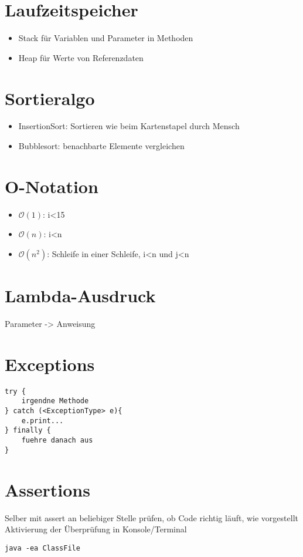 \documentclass[10pt,a4paper]{article}
\begin{document}
\section{Laufzeitspeicher}
\begin{itemize}
\item Stack für Variablen und Parameter in Methoden
\item Heap für Werte von Referenzdaten
\end{itemize}

\section{Sortieralgo}
\begin{itemize}
\item InsertionSort: Sortieren wie beim Kartenstapel durch Mensch
\item Bubblesort: benachbarte Elemente vergleichen
\end{itemize}

\section{O-Notation}
\begin{itemize}
\item $\mathcal{O}(1)$: i<15
\item $\mathcal{O}(n)$: i<n
\item $\mathcal{O}(n^2)$: Schleife in einer Schleife, i<n und j<n
\end{itemize}

\section{Lambda-Ausdruck}
Parameter -> Anweisung

\section{Exceptions}
\begin{lstlisting}
try {
	irgendne Methode
} catch (<ExceptionType> e){
	e.print...
} finally {
	fuehre danach aus
}
\end{lstlisting}

\section{Assertions}
Selber mit assert an beliebiger Stelle prüfen, ob Code richtig läuft, wie vorgestellt
Aktivierung der Überprüfung in Konsole/Terminal
\begin{lstlisting}
java -ea ClassFile
\end{lstlisting}
\end{document}
